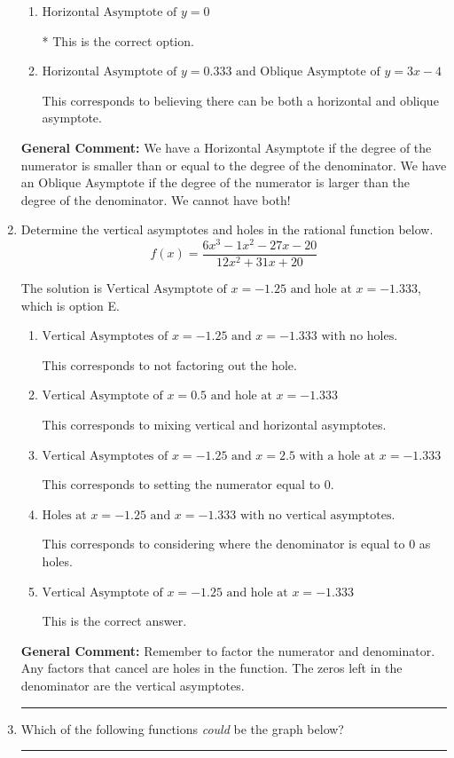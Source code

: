 \documentclass{extbook}[14pt]
\newcommand{\litem}[1]{\item #1

\rule{\textwidth}{0.4pt}}
\begin{document}
\begin{enumerate}
{\begin{enumerate}[label=\Alph*.]
This corresponds to flipping the numerator and denominator, then using synthetic division to find the oblique asymptote.
\item \( \text{Horizontal Asymptote of } y = 0 \)

* This is the correct option.
\item \( \text{Horizontal Asymptote of } y = 0.333 \text{ and Oblique Asymptote of } y = 3x -4 \)

This corresponds to believing there can be both a horizontal and oblique asymptote.
\end{enumerate}

\textbf{General Comment:} We have a Horizontal Asymptote if the degree of the numerator is smaller than or equal to the degree of the denominator. We have an Oblique Asymptote if the degree of the numerator is larger than the degree of the denominator. We cannot have both!
}
\litem{
Determine the vertical asymptotes and holes in the rational function below.
\[ f(x) = \frac{6x^{3} -1 x^{2} -27 x -20}{12x^{2} +31 x + 20} \]

The solution is \( \text{Vertical Asymptote of } x = -1.25 \text{ and hole at } x = -1.333 \), which is option E.\begin{enumerate}[label=\Alph*.]
\item \( \text{Vertical Asymptotes of } x = -1.25 \text{ and } x = -1.333 \text{ with no holes.} \)

This corresponds to not factoring out the hole.
\item \( \text{Vertical Asymptote of } x = 0.5 \text{ and hole at } x = -1.333 \)

This corresponds to mixing vertical and horizontal asymptotes.
\item \( \text{Vertical Asymptotes of } x = -1.25 \text{ and } x = 2.5 \text{ with a hole at } x = -1.333 \)

This corresponds to setting the numerator equal to 0.
\item \( \text{Holes at } x = -1.25 \text{ and } x = -1.333 \text{ with no vertical asymptotes.} \)

This corresponds to considering where the denominator is equal to 0 as holes.
\item \( \text{Vertical Asymptote of } x = -1.25 \text{ and hole at } x = -1.333 \)

This is the correct answer.
\end{enumerate}

\textbf{General Comment:} Remember to factor the numerator and denominator. Any factors that cancel are holes in the function. The zeros left in the denominator are the vertical asymptotes.
}
\litem{
Which of the following functions \textit{could} be the graph below?

}
\end{enumerate}
\end{document}
